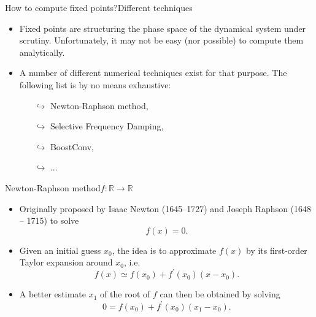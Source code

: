 \documentclass[usenames,dvipsnames,svgnames,10pt,aspectratio=169]{beamer}
\begin{document}
\begin{frame}[t, c]{How to compute fixed points?}{Different techniques}
	\begin{itemize}
		\item Fixed points are structuring the phase space of the dynamical system under scrutiny. Unfortunately, it may not be easy (nor possible) to compute them analytically.

		\bigskip

		\item A number of different numerical techniques exist for that purpose. The following list is by no means exhaustive:
		\begin{itemize}
			\item[$\hookrightarrow$] Newton-Raphson method,
			\item[$\hookrightarrow$] Selective Frequency Damping,
			\item[$\hookrightarrow$] BoostConv,
			\item[$\hookrightarrow$] ...
		\end{itemize}
	\end{itemize}

	\vspace{1cm}
\end{frame}

\begin{frame}[t, c]{Newton-Raphson method}{$f : \mathbb{R} \to \mathbb{R}$}
	\begin{itemize}
		\item Originally proposed by Isaac Newton (1645--1727) and Joseph Raphson (1648 -- 1715) to solve
		$$f(x) = 0.$$

		\medskip

		\item Given an initial guess $x_0$, the idea is to approximate $f(x)$ by its first-order Taylor expansion around $x_0$, i.e.\
		$$
		f(x) \simeq f(x_0) + f^{\prime}(x_0) ( x - x_0).
		$$

		\medskip

		\item A better estimate $x_1$ of the root of $f$ can then be obtained by solving
		$$
		0 = f(x_0) + f^{\prime}(x_0) ( x_1 - x_0).
		$$
	\end{itemize}

	\vspace{1cm}
\end{frame}
\end{document}
